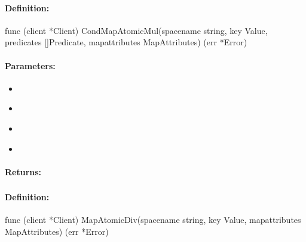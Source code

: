 \paragraph{Definition:}
\begin{gocode}
func (client *Client) CondMapAtomicMul(spacename string, key Value, predicates []Predicate, mapattributes MapAttributes) (err *Error)
\end{gocode}

\paragraph{Parameters:}
\begin{itemize}[noitemsep]
\item {}\\

\item {}\\

\item {}\\

\item {}\\

\end{itemize}

\paragraph{Returns:}


\pagebreak
\subsubsection{}
\label{api:Go:MapAtomicDiv}


\paragraph{Definition:}
\begin{gocode}
func (client *Client) MapAtomicDiv(spacename string, key Value, mapattributes MapAttributes) (err *Error)
\end{gocode}

